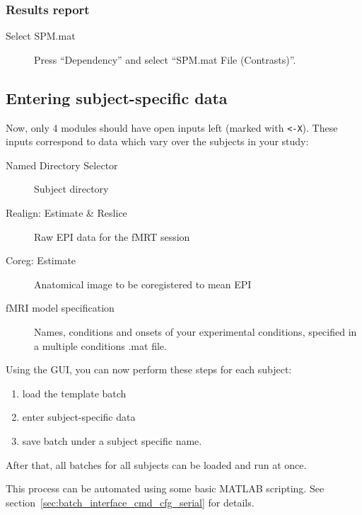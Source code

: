 \documentclass[a4paper]{book}
\begin{document}
\subsubsection*{Results report}

\begin{description}
\item[Select SPM.mat] Press ``Dependency'' and select ``SPM.mat File
  (Contrasts)''. 
\end{description}

\subsection{Entering subject-specific data}

Now, only 4 modules should have open inputs left (marked with \verb|<-X|). These
inputs correspond to data which vary over the subjects in your study:
\begin{description}
\item[Named Directory Selector] Subject directory
\item[Realign: Estimate \& Reslice] Raw EPI data for the fMRT session
\item[Coreg: Estimate] Anatomical image to be coregistered to mean EPI
\item[fMRI model specification] Names, conditions and onsets of your
  experimental conditions, specified in a multiple conditions .mat file.
\end{description}

Using the GUI, you can now perform these steps for each subject:
\begin{enumerate}
\item load the template batch
\item enter subject-specific data
\item save batch under a subject specific name.
\end{enumerate}

After that, all batches for all subjects can be loaded and run at once.

This process can be automated using some basic MATLAB scripting. See
section~\ref{sec:batch_interface_cmd_cfg_serial} for details.
\end{document}
